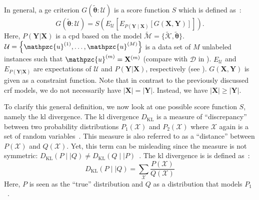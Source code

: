 In general, a \gls{ge} criterion $G(\bm{\tilde{\theta}}:\mathcal{U})$ is a score function $S$ which is defined as~\citep{mann2010generalized}:
\begin{equation}
  \label{equ:generalized-expectation}
  G(\bm{\tilde{\theta}}:\mathcal{U})=S\left(E_{\mathcal{U}}\left[E_{P(\mathbf{Y}\mid\mathbf{X})}\left[G(\mathbf{X},\mathbf{Y})\right]\right]\right).
\end{equation}
Here, $P(\mathbf{Y}|\mathbf{X})$ is a \gls{cpd} based on the model $\tilde{\mathcal{M}}=\{\tilde{\mathcal{K}},\bm{\tilde{\theta}}\}$.
$\mathcal{U}=\left\{\mathpzc{u}^{(1)},\dots,\mathpzc{u}^{(M)}\right\}$ is a data set of $M$ unlabeled instances such that $\mathpzc{u}^{(m)}=\mathbf{X}^{(m)}$ (compare with $\mathcal{D}$ in ).
$E_{\mathcal{U}}$ and $E_{P(\mathbf{Y}|\mathbf{X})}$ are expectations of $\mathcal{U}$ and $P(\mathbf{Y}|\mathbf{X})$, respectively (see ).
$G(\mathbf{X},\mathbf{Y})$ is given as a constraint function.
Note that in contrast to the previously discussed \gls{crf} models, we do not necessarily have $|\mathbf{X}|=|\mathbf{Y}|$.
Instead, we have $|\mathbf{X}|\geq|\mathbf{Y}|$.

\bigskip

To clarify this general definition, we now look at one possible score function $S$, namely the \acrfull{kl} divergence.
The \gls{kl} divergence $D_{\text{KL}}$ is a measure of ``discrepancy'' between two probability distributions $P_1(\mathcal{X})$ and $P_2(\mathcal{X})$ where $\mathcal{X}$ again is a set of \glspl{random variable}~\citep{burnham2003model}.
This measure is also referred to as a ``distance'' between $P(\mathcal{X})$ and $Q(\mathcal{X})$.
Yet, this term can be misleading since the measure is not symmetric: $D_{\text{KL}}(P\mid\mid Q)\neq D_{\text{KL}}(Q\mid\mid P)$~\citep{burnham2003model}.
The \gls{kl} divergence is is defined as~\citep{mackay2003information}:
\begin{equation}
  \label{equ:kl-divergence}
  D_{\text{KL}}(P\mid\mid Q)=\sum_\mathcal{X} \frac{P(\mathcal{X})}{Q(\mathcal{X})}
\end{equation}
Here, $P$ is seen as the ``true'' distribution and $Q$ as a distribution that models $P_1$~\citep{burnham2003model}.

\bigskip

